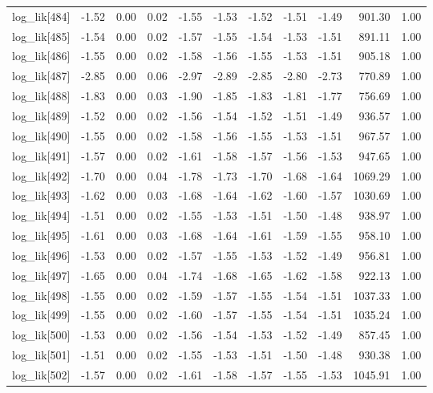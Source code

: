 \begin{table}[ht]
\begin{tabular}{rrrrrrrrrrr}
  log\_lik[484] & -1.52 & 0.00 & 0.02 & -1.55 & -1.53 & -1.52 & -1.51 & -1.49 & 901.30 & 1.00 \\ 
  log\_lik[485] & -1.54 & 0.00 & 0.02 & -1.57 & -1.55 & -1.54 & -1.53 & -1.51 & 891.11 & 1.00 \\ 
  log\_lik[486] & -1.55 & 0.00 & 0.02 & -1.58 & -1.56 & -1.55 & -1.53 & -1.51 & 905.18 & 1.00 \\ 
  log\_lik[487] & -2.85 & 0.00 & 0.06 & -2.97 & -2.89 & -2.85 & -2.80 & -2.73 & 770.89 & 1.00 \\ 
  log\_lik[488] & -1.83 & 0.00 & 0.03 & -1.90 & -1.85 & -1.83 & -1.81 & -1.77 & 756.69 & 1.00 \\ 
  log\_lik[489] & -1.52 & 0.00 & 0.02 & -1.56 & -1.54 & -1.52 & -1.51 & -1.49 & 936.57 & 1.00 \\ 
  log\_lik[490] & -1.55 & 0.00 & 0.02 & -1.58 & -1.56 & -1.55 & -1.53 & -1.51 & 967.57 & 1.00 \\ 
  log\_lik[491] & -1.57 & 0.00 & 0.02 & -1.61 & -1.58 & -1.57 & -1.56 & -1.53 & 947.65 & 1.00 \\ 
  log\_lik[492] & -1.70 & 0.00 & 0.04 & -1.78 & -1.73 & -1.70 & -1.68 & -1.64 & 1069.29 & 1.00 \\ 
  log\_lik[493] & -1.62 & 0.00 & 0.03 & -1.68 & -1.64 & -1.62 & -1.60 & -1.57 & 1030.69 & 1.00 \\ 
  log\_lik[494] & -1.51 & 0.00 & 0.02 & -1.55 & -1.53 & -1.51 & -1.50 & -1.48 & 938.97 & 1.00 \\ 
  log\_lik[495] & -1.61 & 0.00 & 0.03 & -1.68 & -1.64 & -1.61 & -1.59 & -1.55 & 958.10 & 1.00 \\ 
  log\_lik[496] & -1.53 & 0.00 & 0.02 & -1.57 & -1.55 & -1.53 & -1.52 & -1.49 & 956.81 & 1.00 \\ 
  log\_lik[497] & -1.65 & 0.00 & 0.04 & -1.74 & -1.68 & -1.65 & -1.62 & -1.58 & 922.13 & 1.00 \\ 
  log\_lik[498] & -1.55 & 0.00 & 0.02 & -1.59 & -1.57 & -1.55 & -1.54 & -1.51 & 1037.33 & 1.00 \\ 
  log\_lik[499] & -1.55 & 0.00 & 0.02 & -1.60 & -1.57 & -1.55 & -1.54 & -1.51 & 1035.24 & 1.00 \\ 
  log\_lik[500] & -1.53 & 0.00 & 0.02 & -1.56 & -1.54 & -1.53 & -1.52 & -1.49 & 857.45 & 1.00 \\ 
  log\_lik[501] & -1.51 & 0.00 & 0.02 & -1.55 & -1.53 & -1.51 & -1.50 & -1.48 & 930.38 & 1.00 \\ 
  log\_lik[502] & -1.57 & 0.00 & 0.02 & -1.61 & -1.58 & -1.57 & -1.55 & -1.53 & 1045.91 & 1.00 \\ 

\end{tabular}
\end{table}
